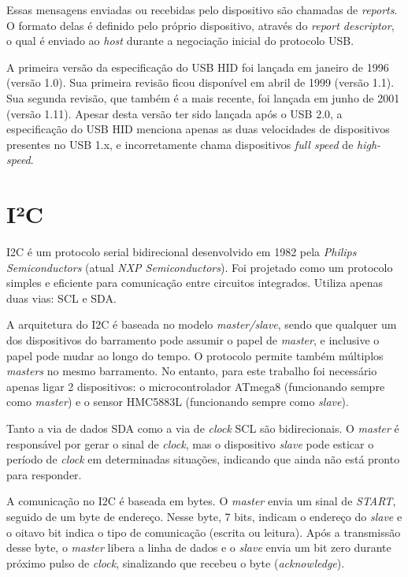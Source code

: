 \documentclass[brazil,pagestart=firstchapter]{abnt}
\begin{document}
Essas mensagens enviadas ou recebidas pelo dispositivo são chamadas de
\textit{reports}. O formato delas é definido pelo próprio dispositivo,
através do \textit{report descriptor}, o qual é enviado ao \textit{host}
durante a negociação inicial do protocolo \ac{USB}. \cite{usbhid}

A primeira versão da especificação do \ac{USB} \ac{HID} foi lançada em
janeiro de 1996 (versão 1.0). Sua primeira revisão ficou disponível em abril
de 1999 (versão 1.1). Sua segunda revisão, que também é a mais recente, foi
lançada em junho de 2001 (versão 1.11). Apesar desta versão ter sido lançada
após o \ac{USB} 2.0, a especificação do \ac{USB} \ac{HID} menciona apenas as
duas velocidades de dispositivos presentes no \ac{USB} 1.x, e incorretamente
chama dispositivos \textit{full speed} de \textit{high-speed}.
\cite{usbhid}


\section{I²C}
\label{sec:i2c}

\ac{I2C} é um protocolo serial bidirecional desenvolvido em 1982 pela
\textit{Philips Semiconductors} (atual \textit{NXP Semiconductors}). Foi
projetado como um protocolo simples e eficiente para comunicação entre
circuitos integrados. Utiliza apenas duas vias: \ac{SCL} e \ac{SDA}.
\cite{UM10204}

A arquitetura do \ac{I2C} é baseada no modelo \textit{master/slave}, sendo
que qualquer um dos dispositivos do barramento pode assumir o papel de
\textit{master}, e inclusive o papel pode mudar ao longo do tempo. O
protocolo permite também múltiplos \textit{masters} no mesmo barramento.
\cite[p.~6]{UM10204} \cite[p.~161]{ATmega8} No entanto, para este trabalho
foi necessário apenas ligar 2 dispositivos: o microcontrolador ATmega8
(funcionando sempre como \textit{master}) e o sensor HMC5883L (funcionando
sempre como \textit{slave}).

Tanto a via de dados \ac{SDA} como a via de \textit{clock} \ac{SCL} são
bidirecionais. O \textit{master} é responsável por gerar o sinal de
\textit{clock}, mas o dispositivo \textit{slave} pode esticar o período de
\textit{clock} em determinadas situações, indicando que ainda não está
pronto para responder. \cite[p.~13]{UM10204}

A comunicação no \ac{I2C} é baseada em bytes. O \textit{master} envia um
sinal de \textit{START}, seguido de um byte de endereço. Nesse byte, 7 bits,
indicam o endereço do \textit{slave} e o oitavo bit indica o tipo de
comunicação (escrita ou leitura). Após a transmissão desse byte, o
\textit{master} libera a linha de dados e o \textit{slave} envia um bit zero
durante próximo pulso de \textit{clock}, sinalizando que recebeu o byte
(\textit{acknowledge}). \cite[p.~3]{AVR315}
\end{document}
